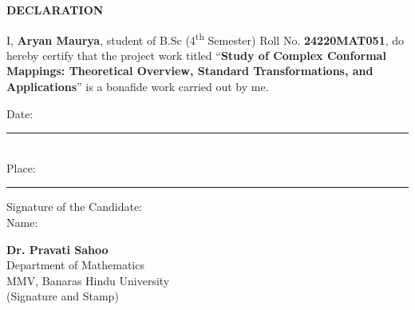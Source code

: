 \documentclass[12pt,a4paper]{article}
\begin{document}
\vspace*{1cm}

\begin{center}
    {\Large \textbf{DECLARATION}}
\end{center}

\vspace{1.5cm}

\large

\noindent I, \textbf{Aryan Maurya}, student of B.Sc (4\textsuperscript{th} Semester) Roll No. \textbf{24220MAT051}, do hereby certify that the project work titled “\textbf{Study of Complex Conformal Mappings: Theoretical Overview, Standard Transformations, and Applications}” is a bonafide work carried out by me.

\vspace{2cm}

\noindent Date: \rule{4cm}{0.4pt} \\[1.5em]
\noindent Place: \rule{4cm}{0.4pt}

\vspace{2.5cm}

\noindent
\begin{minipage}[t]{0.5\textwidth}
    Signature of the Candidate:\\[2.5em]
    Name:
\end{minipage}%
\begin{minipage}[t]{0.5\textwidth}
    \raggedleft
    \textbf{Dr. Pravati Sahoo}\\[0.3em]
    Department of Mathematics\\[0.3em]
    MMV, Banaras Hindu University\\[2em]
    (Signature and Stamp)
\end{minipage}
\end{document}
